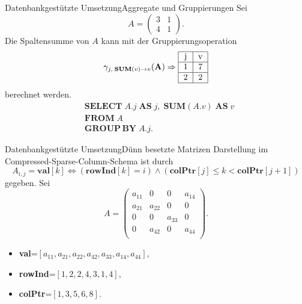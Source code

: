 \documentclass[10pt]{beamer} %
\begin{document}
\begin{frame}{Datenbankgestützte Umsetzung}{Aggregate und Gruppierungen}
Sei
\begin{equation*}
    A=\begin{pmatrix}
        3 &1\\
        4 &1
    \end{pmatrix}.
\end{equation*}
Die Spaltensumme von $A$ kann mit der Gruppierungsoperation
\begin{equation*}
    \gamma_{j, \; \mathbf{SUM}(v) \rightarrow v}(\mathbf{A}) \Rightarrow 
    \begin{tabular}{|c|c|} \hline
        j &v\\
        \hline
        1 &7\\
        \hline
        2 &2\\
        \hline
    \end{tabular}
\end{equation*} 
berechnet werden.  
\begin{align*}
   & \mathbf{SELECT} \; A.j \; \mathbf{AS} \; j, \; \mathbf{SUM} (A.v) \; \mathbf{AS} \; v\\
   & \mathbf{FROM} \; A \\
   & \mathbf{GROUP} \, \mathbf{BY} \; A.j.
\end{align*}

\end{frame}

\begin{frame}{Datenbankgestützte Umsetzung}{Dünn besetzte Matrizen}
   Darstellung im Compressed-Sparse-Column-Schema ist durch 
\begin{equation*}
    A_{i,j}=\mathbf{val}[k] \Leftrightarrow (\mathbf{rowInd}[k]=i) \wedge (\mathbf{colPtr}[j] \leq k < \mathbf{colPtr}[j+1])
\end{equation*} 
gegeben. 
\pause
    Sei
    \begin{equation*}
        A=\begin{pmatrix}
            a_{11} &0 &0 &a_{14} \\
            a_{21} &a_{22} &0 &0 \\
            0 &0 &a_{33} &0 \\
            0 &a_{42} &0 &a_{44}\\
        \end{pmatrix}.
    \end{equation*}

    \begin{itemize}
        \item \textbf{val}=$[a_{11}, a_{21}, a_{22}, a_{42}, a_{33}, a_{14}, a_{44}]$,
        \item \textbf{rowInd}=$[1, 2, 2, 4, 3, 1, 4]$,
        \item \textbf{colPtr}=$[1, 3, 5, 6, 8]$.
    \end{itemize}
\end{frame}
\end{document}
